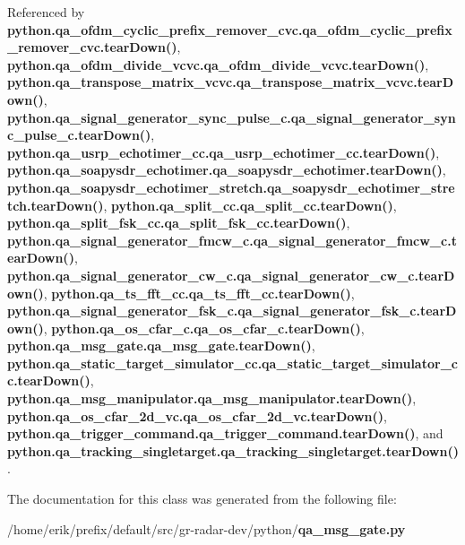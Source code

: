 Referenced by {\bf python.\+qa\+\_\+ofdm\+\_\+cyclic\+\_\+prefix\+\_\+remover\+\_\+cvc.\+qa\+\_\+ofdm\+\_\+cyclic\+\_\+prefix\+\_\+remover\+\_\+cvc.\+tear\+Down()}, {\bf python.\+qa\+\_\+ofdm\+\_\+divide\+\_\+vcvc.\+qa\+\_\+ofdm\+\_\+divide\+\_\+vcvc.\+tear\+Down()}, {\bf python.\+qa\+\_\+transpose\+\_\+matrix\+\_\+vcvc.\+qa\+\_\+transpose\+\_\+matrix\+\_\+vcvc.\+tear\+Down()}, {\bf python.\+qa\+\_\+signal\+\_\+generator\+\_\+sync\+\_\+pulse\+\_\+c.\+qa\+\_\+signal\+\_\+generator\+\_\+sync\+\_\+pulse\+\_\+c.\+tear\+Down()}, {\bf python.\+qa\+\_\+usrp\+\_\+echotimer\+\_\+cc.\+qa\+\_\+usrp\+\_\+echotimer\+\_\+cc.\+tear\+Down()}, {\bf python.\+qa\+\_\+soapysdr\+\_\+echotimer.\+qa\+\_\+soapysdr\+\_\+echotimer.\+tear\+Down()}, {\bf python.\+qa\+\_\+soapysdr\+\_\+echotimer\+\_\+stretch.\+qa\+\_\+soapysdr\+\_\+echotimer\+\_\+stretch.\+tear\+Down()}, {\bf python.\+qa\+\_\+split\+\_\+cc.\+qa\+\_\+split\+\_\+cc.\+tear\+Down()}, {\bf python.\+qa\+\_\+split\+\_\+fsk\+\_\+cc.\+qa\+\_\+split\+\_\+fsk\+\_\+cc.\+tear\+Down()}, {\bf python.\+qa\+\_\+signal\+\_\+generator\+\_\+fmcw\+\_\+c.\+qa\+\_\+signal\+\_\+generator\+\_\+fmcw\+\_\+c.\+tear\+Down()}, {\bf python.\+qa\+\_\+signal\+\_\+generator\+\_\+cw\+\_\+c.\+qa\+\_\+signal\+\_\+generator\+\_\+cw\+\_\+c.\+tear\+Down()}, {\bf python.\+qa\+\_\+ts\+\_\+fft\+\_\+cc.\+qa\+\_\+ts\+\_\+fft\+\_\+cc.\+tear\+Down()}, {\bf python.\+qa\+\_\+signal\+\_\+generator\+\_\+fsk\+\_\+c.\+qa\+\_\+signal\+\_\+generator\+\_\+fsk\+\_\+c.\+tear\+Down()}, {\bf python.\+qa\+\_\+os\+\_\+cfar\+\_\+c.\+qa\+\_\+os\+\_\+cfar\+\_\+c.\+tear\+Down()}, {\bf python.\+qa\+\_\+msg\+\_\+gate.\+qa\+\_\+msg\+\_\+gate.\+tear\+Down()}, {\bf python.\+qa\+\_\+static\+\_\+target\+\_\+simulator\+\_\+cc.\+qa\+\_\+static\+\_\+target\+\_\+simulator\+\_\+cc.\+tear\+Down()}, {\bf python.\+qa\+\_\+msg\+\_\+manipulator.\+qa\+\_\+msg\+\_\+manipulator.\+tear\+Down()}, {\bf python.\+qa\+\_\+os\+\_\+cfar\+\_\+2d\+\_\+vc.\+qa\+\_\+os\+\_\+cfar\+\_\+2d\+\_\+vc.\+tear\+Down()}, {\bf python.\+qa\+\_\+trigger\+\_\+command.\+qa\+\_\+trigger\+\_\+command.\+tear\+Down()}, and {\bf python.\+qa\+\_\+tracking\+\_\+singletarget.\+qa\+\_\+tracking\+\_\+singletarget.\+tear\+Down()}.



The documentation for this class was generated from the following file\+:\begin{DoxyCompactItemize}
\item 
/home/erik/prefix/default/src/gr-\/radar-\/dev/python/{\bf qa\+\_\+msg\+\_\+gate.\+py}\end{DoxyCompactItemize}
